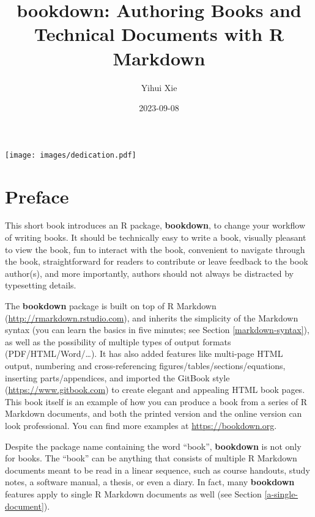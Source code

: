\documentclass[
  12pt,
]{krantz}
\title{bookdown: Authoring Books and Technical Documents with R Markdown}
\author{Yihui Xie}
\date{2023-09-08}
\begin{document}
\maketitle

\thispagestyle{empty}
\begin{center}
\texttt{[image: images/dedication.pdf]}
\end{center}

\setlength{\abovedisplayskip}{-5pt}
\setlength{\abovedisplayshortskip}{-5pt}

{
\hypersetup{linkcolor=}
\setcounter{tocdepth}{2}
\tableofcontents
}
\listoffigures
\listoftables
\hypertarget{preface}{%
\chapter*{Preface}\label{preface}}


This short book introduces an R package, \textbf{bookdown}, to change your workflow of writing books. It should be technically easy to write a book, visually pleasant to view the book, fun to interact with the book, convenient to navigate through the book, straightforward for readers to contribute or leave feedback to the book author(s), and more importantly, authors should not always be distracted by typesetting details.

The \textbf{bookdown} package is built on top of R Markdown (\url{http://rmarkdown.rstudio.com}), and inherits the simplicity of the Markdown syntax (you can learn the basics in five minutes; see Section \ref{markdown-syntax}), as well as the possibility of multiple types of output formats (PDF/HTML/Word/\ldots). It has also added features like multi-page HTML output, numbering and cross-referencing figures/tables/sections/equations, inserting parts/appendices, and imported the GitBook style (\url{https://www.gitbook.com}) to create elegant and appealing HTML book pages. This book itself is an example of how you can produce a book from a series of R Markdown documents, and both the printed version and the online version can look professional. You can find more examples at \url{https://bookdown.org}.

Despite the package name containing the word ``book'', \textbf{bookdown} is not only for books. The ``book'' can be anything that consists of multiple R Markdown documents meant to be read in a linear sequence, such as course handouts, study notes, a software manual, a thesis, or even a diary. In fact, many \textbf{bookdown} features apply to single R Markdown documents as well (see Section \ref{a-single-document}).
\end{document}
